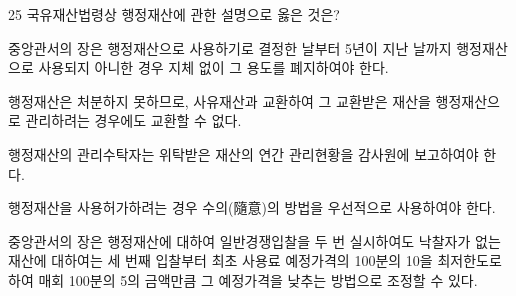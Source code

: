 \begin{question}{25}
국유재산법령상 행정재산에 관한 설명으로 옳은 것은?
\begin{choices}
  \item 중앙관서의 장은 행정재산으로 사용하기로 결정한 날부터 5년이 지난 날까지 행정재산으로 사용되지 아니한 경우 지체 없이 그 용도를 폐지하여야 한다.
  \item 행정재산은 처분하지 못하므로, 사유재산과 교환하여 그 교환받은 재산을 행정재산으로 관리하려는 경우에도 교환할 수 없다.
  \item 행정재산의 관리수탁자는 위탁받은 재산의 연간 관리현황을 감사원에 보고하여야 한다.
  \item 행정재산을 사용허가하려는 경우 수의(隨意)의 방법을 우선적으로 사용하여야 한다.
  \item 중앙관서의 장은 행정재산에 대하여 일반경쟁입찰을 두 번 실시하여도 낙찰자가 없는 재산에 대하여는 세 번째 입찰부터 최초 사용료 예정가격의 100분의 10을 최저한도로 하여 매회 100분의 5의 금액만큼 그 예정가격을 낮추는 방법으로 조정할 수 있다.
\end{choices}
\end{question}
